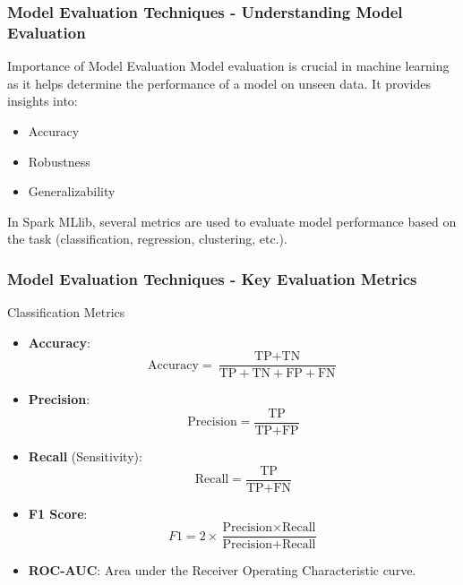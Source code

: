 \documentclass[aspectratio=169]{beamer}
\begin{document}
\begin{frame}[fragile]
    \frametitle{Model Evaluation Techniques - Understanding Model Evaluation}
    \begin{block}{Importance of Model Evaluation}
        Model evaluation is crucial in machine learning as it helps determine the performance of a model on unseen data. 
        It provides insights into:
        \begin{itemize}
            \item Accuracy
            \item Robustness
            \item Generalizability
        \end{itemize}
        In Spark MLlib, several metrics are used to evaluate model performance based on the task (classification, regression, clustering, etc.).
    \end{block}
\end{frame}

\begin{frame}[fragile]
    \frametitle{Model Evaluation Techniques - Key Evaluation Metrics}
    \begin{block}{Classification Metrics}
        \begin{itemize}
            \item \textbf{Accuracy}:
            \[
            \text{Accuracy} = \frac{\text{TP} + \text{TN}}{\text{TP} + \text{TN} + \text{FP} + \text{FN}}
            \]
            \item \textbf{Precision}:
            \[
            \text{Precision} = \frac{\text{TP}}{\text{TP} + \text{FP}}
            \]
            \item \textbf{Recall} (Sensitivity):
            \[
            \text{Recall} = \frac{\text{TP}}{\text{TP} + \text{FN}}
            \]
            \item \textbf{F1 Score}:
            \[
            F1 = 2 \times \frac{\text{Precision} \times \text{Recall}}{\text{Precision} + \text{Recall}}
            \]
            \item \textbf{ROC-AUC}: 
            Area under the Receiver Operating Characteristic curve.
        \end{itemize}
    \end{block}
\end{frame}
\end{document}
